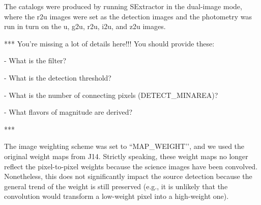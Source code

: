 \documentclass[apj,iop]{emulateapj}
\begin{document}

The catalogs were produced by running SExtractor in the dual-image mode, where the r2u images were set as the detection images and the photometry was run in turn on the u, g2u, r2u, i2u, and z2u images. 

*** You’re missing a lot of details here!!!  You should provide these:

- What is the filter?

- What is the detection threshold?

- What is the number of connecting pixels (DETECT\_MINAREA)?

- What flavors of magnitude are derived?

***

The image weighting scheme was set to ``MAP\_WEIGHT’’, and we used the original weight maps from J14. Strictly speaking, these weight maps no longer reflect the pixel-to-pixel weights because the science images have been convolved. Nonetheless, this does not significantly impact the source detection because the general trend of the weight is still preserved (e.g., it is unlikely that the convolution would transform a low-weight pixel into a high-weight one). 
\end{document}
